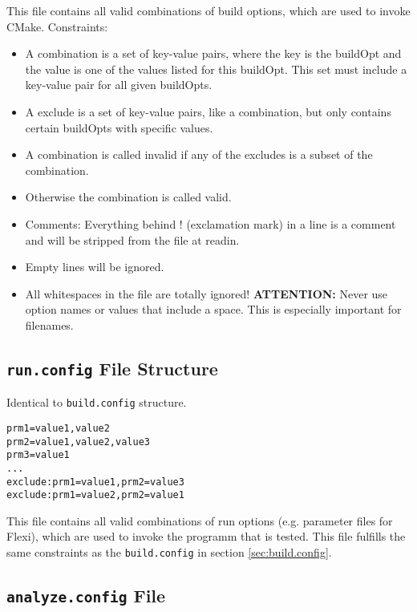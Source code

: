 \documentclass[11pt]{scrartcl}
\begin{document}
This file contains all valid combinations of build options, which are used to invoke CMake.
Constraints:
\begin{itemize}
   \item A combination is a set of key-value pairs, where the key is the buildOpt and the value is one of the values listed for this buildOpt. This set must include a key-value pair for all given buildOpts. 
   \item A exclude is a set of key-value pairs, like a combination, but only contains certain buildOpts with specific values. 
   \item A combination is called invalid if any of the excludes is a subset of the combination. 
   \item Otherwise the combination is called valid.
   \item Comments: Everything behind ! (exclamation mark) in a line is a comment and will be stripped from the file at readin. 
   \item Empty lines will be ignored.
   \item All whitespaces in the file are totally ignored! \textbf{ATTENTION:} Never use option names or values that include a space. This is especially important for filenames.
\end{itemize}






\subsection{\texttt{run.config} File Structure}

Identical to \texttt{build.config} structure.

\begin{adjustbox}{padding=10pt 0pt 10pt 0pt, fbox}
\begin{lstlisting}
prm1=value1,value2
prm2=value1,value2,value3
prm3=value1
...
exclude:prm1=value1,prm2=value3
exclude:prm1=value2,prm2=value1
\end{lstlisting}
\end{adjustbox}
\vspace{1em}

This file contains all valid combinations of run options (e.g. parameter files for Flexi), which are used to invoke the programm that is tested.
This file fulfills the same constraints as the \texttt{build.config} in section \ref{sec:build.config}.



\subsection{\texttt{analyze.config} File}
\end{document}
